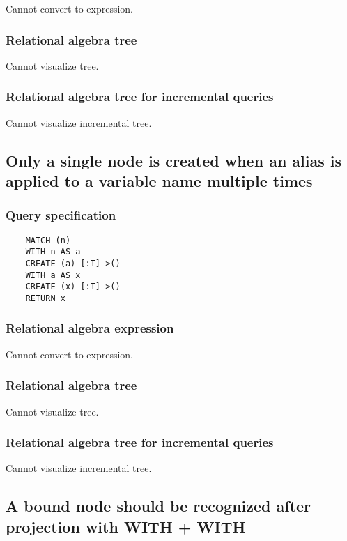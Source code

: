 	Cannot convert to expression.

	\subsubsection*{Relational algebra tree}

	Cannot visualize tree.

	\subsubsection*{Relational algebra tree for incremental queries}

	Cannot visualize incremental tree.
	\subsection{Only a single node is created when an alias is applied to a variable name multiple times}

	\subsubsection*{Query specification}

	\begin{lstlisting}
	MATCH (n)
	WITH n AS a
	CREATE (a)-[:T]->()
	WITH a AS x
	CREATE (x)-[:T]->()
	RETURN x
	\end{lstlisting}


	\subsubsection*{Relational algebra expression}

	Cannot convert to expression.

	\subsubsection*{Relational algebra tree}

	Cannot visualize tree.

	\subsubsection*{Relational algebra tree for incremental queries}

	Cannot visualize incremental tree.
	\subsection{A bound node should be recognized after projection with WITH + WITH}

